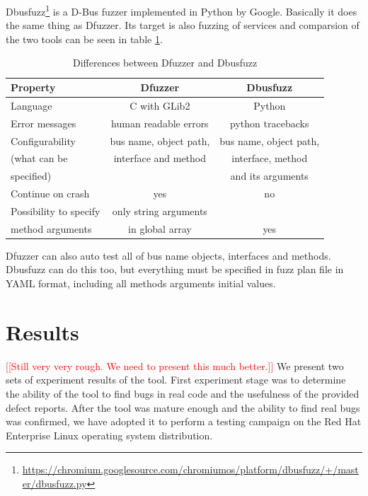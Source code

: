 \documentclass[conference]{IEEEtran}
\newcommand{\addtodo}[1]{\textcolor{red}{[[#1]]}}
\begin{document}
Dbusfuzz\footnote{\url{https://chromium.googlesource.com/chromiumos/platform/dbusfuzz/+/master/dbusfuzz.py}} is a D-Bus fuzzer implemented in Python by Google. Basically it does
the same thing as Dfuzzer. Its target is also fuzzing of services and comparsion
of the two tools can be seen in table \ref{tab:differences}.

\FloatBarrier
\begin{table}[!h]
\caption{Differences between Dfuzzer and Dbusfuzz}
\label{tab:differences}
\begin{center}
	\begin{tabular}{|l|c|c|}
	\hline
	\textbf{Property} & \textbf{Dfuzzer} & \textbf{Dbusfuzz} \\ \hline \hline
	Language & C with GLib2 & Python \\ \hline
	Error messages & human readable errors & python tracebacks \\ \hline
	Configurability & bus name, object path, & bus name, object path, \\
		(what can be & interface and method & interface, method \\
		specified) & & and its arguments\\ \hline
	Continue on crash & yes & no \\ \hline
	Possibility to specify & only string arguments & \\
		method arguments & in global array & yes \\ \hline
	\end{tabular}
\end{center}
\end{table}
\FloatBarrier

Dfuzzer can also auto test all of bus name objects, interfaces and methods.
Dbusfuzz can do this too, but everything must be specified in fuzz plan file
in YAML format, including all methods arguments initial values.


\section{Results}
\addtodo{Still very very rough. We need to present this much better.}
We present two sets of experiment results of the tool. First experiment stage
was to determine the ability of the tool to find bugs in real code and the
usefulness of the provided defect reports. After the tool was mature enough and
the ability to find real bugs was confirmed, we have adopted it to perform a
testing campaign on the Red Hat Enterprise Linux operating system distribution.
 
\end{document}
